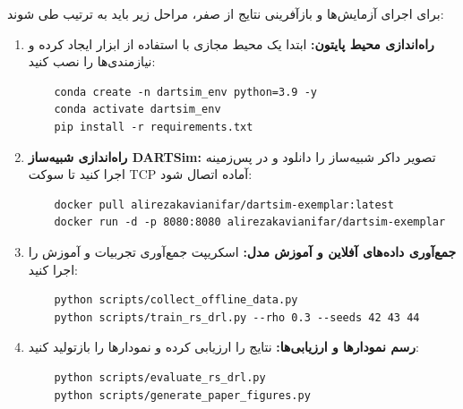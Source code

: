 \documentclass[oneside,openany,a4paper,12pt,draft]{article}
\begin{document}
برای اجرای آزمایش‌ها و بازآفرینی نتایج از صفر، مراحل زیر باید به ترتیب طی شوند:
\begin{enumerate}
    \item \textbf{راه‌اندازی محیط پایتون:} ابتدا یک محیط مجازی با استفاده از ابزار  ایجاد کرده و نیازمندی‌ها را نصب کنید:
    \begin{singlespace}
    \begin{latin}
    \begin{verbatim}
    conda create -n dartsim_env python=3.9 -y
    conda activate dartsim_env
    pip install -r requirements.txt
    \end{verbatim}
    \end{latin}
    \end{singlespace}
    
    \item \textbf{راه‌اندازی شبیه‌ساز DARTSim:} تصویر داکر شبیه‌ساز را دانلود و در پس‌زمینه اجرا کنید تا سوکت TCP آماده اتصال شود:
    \begin{singlespace}
    \begin{latin}
    \begin{verbatim}
    docker pull alirezakavianifar/dartsim-exemplar:latest
    docker run -d -p 8080:8080 alirezakavianifar/dartsim-exemplar
    \end{verbatim}
    \end{latin}
    \end{singlespace}
    
    \item \textbf{جمع‌آوری داده‌های آفلاین و آموزش مدل:} اسکریپت جمع‌آوری تجربیات و آموزش را اجرا کنید:
    \begin{singlespace}
    \begin{latin}
    \begin{verbatim}
    python scripts/collect_offline_data.py
    python scripts/train_rs_drl.py --rho 0.3 --seeds 42 43 44
    \end{verbatim}
    \end{latin}
    \end{singlespace}
    
    \item \textbf{رسم نمودارها و ارزیابی‌ها:} نتایج را ارزیابی کرده و نمودارها را بازتولید کنید:
    \begin{singlespace}
    \begin{latin}
    \begin{verbatim}
    python scripts/evaluate_rs_drl.py
    python scripts/generate_paper_figures.py
    \end{verbatim}
    \end{latin}
    \end{singlespace}
\end{enumerate}
\end{document}
